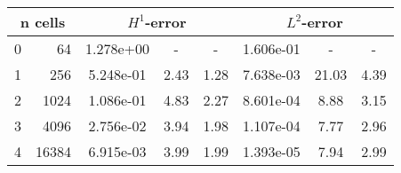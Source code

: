 \documentclass[10pt]{report}
\begin{document}
\begin{table}[H]
\begin{center}
\begin{tabular}{|c|r|c|c|c|c|c|c|} \hline

\multicolumn{2}{|c|}{n cells} & 
\multicolumn{3}{|c|}{$H^1$-error} & 
\multicolumn{3}{|c|}{$L^2$-error}\\ \hline
0 & 64 & 1.278e+00 & - & - & 1.606e-01 & - & -\\ \hline
1 & 256 & 5.248e-01 & 2.43 & 1.28 & 7.638e-03 & 21.03 & 4.39\\ \hline
2 & 1024 & 1.086e-01 & 4.83 & 2.27 & 8.601e-04 & 8.88 & 3.15\\ \hline
3 & 4096 & 2.756e-02 & 3.94 & 1.98 & 1.107e-04 & 7.77 & 2.96\\ \hline
4 & 16384 & 6.915e-03 & 3.99 & 1.99 & 1.393e-05 & 7.94 & 2.99\\ \hline
\end{tabular}
\end{center}
\end{table}
\end{document}
